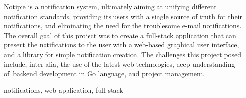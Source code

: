 \abstract
Notipie is a notification system,
ultimately aiming at unifying
different notification standards,
providing its users with a single source of truth
for their notifications,
and eliminating the need
for the troublesome e-mail notifications.
The overall goal of this project
was to create a full-stack application
that can present the notifications to the user
with a web-based graphical user interface,
and a library
for simple notification creation.
The challenges this project posed include,
inter alia,
the use of the latest web technologies,
deep understanding of~backend development in Go language,
and project management.

\keywords notifications, web application, full-stack
